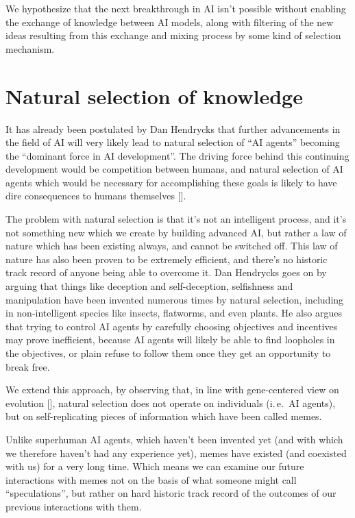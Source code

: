 \documentclass[12pt]{article}
\newcommand{\citestrut}[1]{\vphantom{[}{#1}\vphantom{]}}
\renewcommand{\cite}[1]{[\hyperlink{#1}{\citestrut{#1}}]}
\begin{document}
We hypothesize that the next breakthrough in AI isn't possible without enabling the
exchange of knowledge between AI models, along with filtering of the new ideas resulting
from this exchange and mixing process by some kind of selection mechanism.

\section{Natural selection of knowledge}

It has already been postulated by Dan Hendrycks that further advancements in the field of
AI will very likely lead to natural selection of ``AI agents'' becoming the ``dominant
force in AI development''. The driving force behind this continuing development would be
competition between humans, and natural selection of AI agents which would be necessary
for accomplishing these goals is likely to have dire consequences to humans themselves
\cite{NaturalSelection}.

The problem with natural selection is that it's not an intelligent process, and it's not
something new which we create by building advanced AI, but rather a law of nature which
has been existing always, and cannot be switched off. This law of nature has also been
proven to be extremely efficient, and there's no historic track record of anyone being
able to overcome it. Dan Hendrycks goes on by arguing that things like deception and
self-deception, selfishness and manipulation have been invented numerous times by natural
selection, including in non-intelligent species like insects, flatworms, and even plants.
He also argues that trying to control AI agents by carefully choosing objectives and
incentives may prove inefficient, because AI agents will likely be able to find loopholes
in the objectives, or plain refuse to follow them once they get an opportunity to break
free.

We extend this approach, by observing that, in line with gene-centered view on evolution
\cite{GenesFirst}, natural selection does not operate on individuals (i.\,e.\ AI agents),
but on self-replicating pieces of information which have been called memes.

Unlike superhuman AI agents, which haven't been invented yet (and with which we
therefore haven't had any experience yet), memes have existed (and coexisted with us) for
a very long time. Which means we can examine our future interactions with memes not on
the basis of what someone might call ``speculations'', but rather on hard historic track
record of the outcomes of our previous interactions with them.
\end{document}
